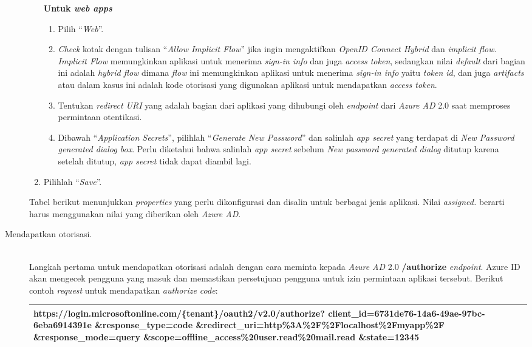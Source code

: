 \begin{description}
\begin{enumerate}
		\subitem \textbf{Untuk \textit{web apps}}
		\begin{enumerate}
		\item Pilih ``\textit{Web}''.
		\item \textit{Check} kotak dengan tulisan ``\textit{Allow Implicit Flow}'' jika ingin mengaktifkan \textit{OpenID Connect Hybrid} dan \textit{implicit flow}. \textit{Implicit Flow} memungkinkan aplikasi untuk menerima \textit{sign-in info} dan juga \textit{access token}, sedangkan nilai \textit{default} dari bagian ini adalah \textit{hybrid flow} dimana \textit{flow} ini memungkinkan aplikasi untuk menerima \textit{sign-in info} yaitu \textit{token id}, dan juga \textit{artifacts} atau dalam kasus ini adalah kode otorisasi yang digunakan aplikasi untuk mendapatkan \textit{access token}.
		\item Tentukan \textit{redirect URI} yang adalah bagian dari aplikasi yang dihubungi oleh \textit{endpoint} dari \textit{Azure AD} 2.0 saat memproses permintaan otentikasi. 
		\item Dibawah ``\textit{Application Secrets}'', pilihlah ``\textit{Generate New Password}'' dan salinlah \textit{app secret} yang terdapat di \textit{New Password generated dialog box}. Perlu diketahui bahwa salinlah \textit{app secret} sebelum \textit{New password generated dialog} ditutup karena setelah ditutup, \textit{app secret} tidak dapat diambil lagi. 
		\end{enumerate}
	\item Pilihlah ``\textit{Save}''.			 
	\end{enumerate}
	
Tabel berikut menunjukkan \textit{properties} yang perlu dikonfigurasi dan disalin untuk berbagai jenis aplikasi. Nilai \textit{assigned.} berarti harus menggunakan nilai yang diberikan oleh \textit{Azure AD}. 

\item [Mendapatkan otorisasi.]\hfill \\Langkah pertama untuk mendapatkan otorisasi adalah dengan cara meminta kepada \textit{Azure AD} 2.0 \textbf{/authorize} \textit{endpoint}. Azure ID akan mengecek pengguna yang masuk dan memastikan persetujuan pengguna untuk izin permintaan aplikasi tersebut. Berikut contoh \textit{request} untuk mendapatkan \textit{authorize code}:

\begin{center}
	\begin{tabular}{|p{15cm}|}
	\hline
	https://login.microsoftonline.com/\{tenant\}/oauth2/v2.0/authorize?\newline
	client\_id=6731de76-14a6-49ae-97bc-6eba6914391e\newline
	\&response\_type=code\newline
	\&redirect\_uri=http\%3A\%2F\%2Flocalhost\%2Fmyapp\%2F\newline
	\&response\_mode=query\newline
	\&scope=offline\_access\%20user.read\%20mail.read\newline
	\&state=12345\\
	\hline
	\end{tabular}
\end{center}


\end{description}
